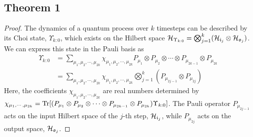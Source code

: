 \subsection{Theorem 1}

\begin{proof}
    The dynamics of a quantum process over \(k\) timesteps can be described by its Choi state, \(\Upsilon_{k:0}\), which exists on the Hilbert space \(\mathcal{H}_{\Upsilon_{k:0}}=\bigotimes_{j=1}^k(\mathcal{H}_{\mathfrak{i}_j}\otimes\mathcal{H}_{\mathfrak{o}_j})\). We can express this state in the Pauli basis as
    \begin{equation}\label{eq:pauli-expansion}
    \begin{split}
    \Upsilon_{k:0} &= \sum_{\mu_1,\mu_2,\cdots,\mu_{2k}} \chi_{\mu_1,\mu_2,\cdots,\mu_{2k}}P_{\mu_1}\otimes P_{\mu_2} \otimes \cdots \otimes P_{\mu_{2k-1}} \otimes  P_{\mu_{2k}} \\
    &=\sum_{{\mu_1,\mu_2,\cdots,\mu_{2k}}}\chi_{\mu_1,\mu_2,\cdots,\mu_{2k}} \bigotimes_{j=1}^k(P_{\mu_{2j-1}}\otimes P_{\mu_{2j}})
    \end{split}
    \end{equation}
Here, the coefficients \(\chi_{\mu_1,\mu_2,\cdots,\mu_{2k}}\) are real numbers determined by \(\chi_{\mu_1,\cdots,\mu_{2k}} = \mathrm{Tr}[(P_{\mu_1}\otimes P_{\mu_2} \otimes \cdots \otimes P_{\mu_{2k-1}} \otimes  P_{\mu_{2k}})\Upsilon_{k:0}]\). The Pauli operator \(P_{\mu_{2j-1}}\) acts on the input Hilbert space of the \(j\)-th step, \(\mathcal{H}_{\mathfrak{i}_j}\), while \(P_{\mu_{2j}}\) acts on the output space, \(\mathcal{H}_{\mathfrak{o}_j}\).


\end{proof}
